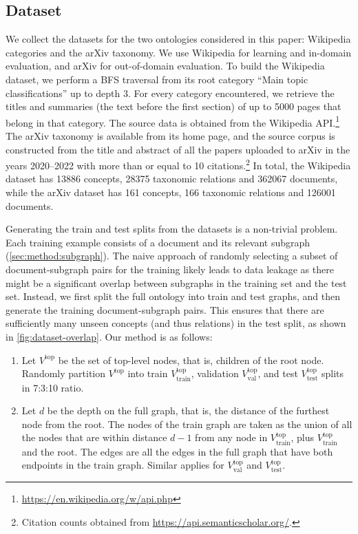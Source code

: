 \documentclass{article}
\begin{document}
\subsection{Dataset}  \label{sec:dataset}



We collect the datasets for the two ontologies considered in this paper: Wikipedia categories and the arXiv taxonomy. We use Wikipedia for learning and in-domain evaluation, and arXiv for out-of-domain evaluation. To build the Wikipedia dataset, we perform a BFS traversal from its root category ``Main topic classifications'' up to depth 3. For every category encountered, we retrieve the titles and summaries (the text before the first section) of up to 5000 pages that belong in that category. The source data is obtained from the Wikipedia API.\footnote{\url{https://en.wikipedia.org/w/api.php}} 
The arXiv taxonomy is available from its home page, and the source corpus is constructed from the title and abstract of all the papers uploaded to arXiv in the years 2020--2022 with more than or equal to 10 citations.\footnote{Citation counts obtained from \url{https://api.semanticscholar.org/}.} In total, the Wikipedia dataset has 13886 concepts, 28375 taxonomic relations and 362067 documents, while the arXiv dataset has 161 concepts, 166 taxonomic relations and 126001 documents.


Generating the train and test splits from the datasets is a non-trivial problem. Each training example consists of a document and its relevant subgraph (\cref{sec:method:subgraph}). The naive approach of randomly selecting a subset of document-subgraph pairs for the training likely leads to data leakage as there might be a significant overlap between subgraphs in the training set and the test set. Instead, we first split the full ontology into train and test graphs, and then generate the training document-subgraph pairs. This ensures that there are sufficiently many unseen concepts (and thus relations) in the test split, as shown in \cref{fig:dataset-overlap}. Our method is as follows:
\begin{enumerate}[itemsep=0pt,leftmargin=*]
    \item Let $V^\text{top}$ be the set of top-level nodes, that is, children of the root node. Randomly partition $V^\text{top}$ into train $V^\text{top}_{\text{train}}$, validation $V^\text{top}_{\text{val}}$, and test $V^\text{top}_{\text{test}}$ splits in 7:3:10 ratio.
    \item Let $d$ be the depth on the full graph, that is, the distance of the furthest node from the root. The nodes of the train graph are taken as the union of all the nodes that are within distance $d - 1$ from any node in $V^\text{top}_\text{train}$, plus $V_\text{train}^\text{top}$ and the root. The edges are all the edges in the full graph that have both endpoints in the train graph. Similar applies for $V^\text{top}_\text{val}$ and $V^\text{top}_\text{test}$.
\end{enumerate}
\end{document}
